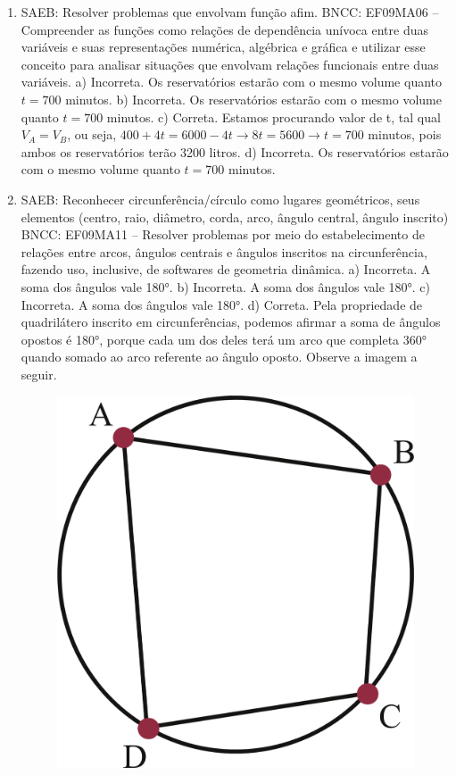 \begin{enumerate}
\item
SAEB: Resolver problemas que envolvam função afim.
BNCC: EF09MA06 -- Compreender as funções como relações de dependência
unívoca entre duas variáveis e suas representações numérica, algébrica e
gráfica e utilizar esse conceito para analisar situações que envolvam
relações funcionais entre duas variáveis.
a) Incorreta. Os reservatórios estarão com o mesmo volume quanto $t = 700$ minutos.  
b) Incorreta. Os reservatórios estarão com o mesmo volume quanto $t = 700$ minutos.
c) Correta. Estamos procurando valor de t, tal qual $V_A = V_B$, ou seja,
$400 + 4t = 6000 - 4t \rightarrow 8t = 5600 \rightarrow t = 700$
minutos, pois ambos os reservatórios terão 3200 litros.
d) Incorreta. Os reservatórios estarão com o mesmo volume quanto $t = 700$ minutos.

\item
SAEB: Reconhecer circunferência/círculo como lugares
geométricos, seus elementos (centro, raio, diâmetro, corda, arco, ângulo
central, ângulo inscrito)
BNCC: EF09MA11 -- Resolver problemas por meio do estabelecimento de
relações entre arcos, ângulos centrais e ângulos inscritos na
circunferência, fazendo uso, inclusive, de softwares de geometria
dinâmica.
a) Incorreta. A soma dos ângulos vale 180°.
b) Incorreta. A soma dos ângulos vale 180°.
c) Incorreta. A soma dos ângulos vale 180°.
d) Correta. Pela propriedade de quadrilátero inscrito em circunferências, 
podemos afirmar a soma de ângulos opostos é 180°, porque cada um 
dos deles terá um arco que completa 360° quando somado ao arco referente 
ao ângulo oposto. Observe a imagem a seguir.
\begin{figure}[htpb!]
\centering
\includegraphics[width=\textwidth]{./ilustras-mat/Simulado_2-atividade_10_resposta.png}
\end{figure}


\end{enumerate}
